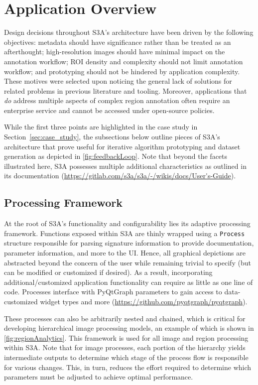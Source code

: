 \section{Application Overview}\label{sec:appFeatures}
Design decisions throughout S3A's architecture have been driven by the following objectives: metadata should have significance rather than be treated as an afterthought; high-resolution images should have minimal impact on the annotation workflow; ROI density and complexity should not limit annotation workflow; and prototyping should not be hindered by application complexity.
These motives were selected upon noticing the general lack of solutions for related problems in previous literature and tooling. Moreover, applications that \emph{do} address multiple aspects of complex region annotation often require an enterprise service and cannot be accessed under open-source policies.

While the first three points are highlighted in the case study in Section~\ref{sec:case_study}, the subsections below outline pieces of S3A's architecture that prove useful for iterative algorithm prototyping and dataset generation as depicted in \autoref{fig:feedbackLoop}. Note that beyond the facets illustrated here, S3A possesses multiple additional characteristics as outlined in its documentation (\url{https://gitlab.com/s3a/s3a/-/wikis/docs/User's-Guide}).

\makeFeedbackLoopFig

\subsection{Processing Framework}\label{sec:procFramework}
At the root of S3A's functionality and configurability lies its adaptive processing framework. Functions exposed within S3A are thinly wrapped using a \texttt{Process} structure responsible for parsing signature information to provide documentation, parameter information, and more to the UI. Hence, all graphical depictions are abstracted beyond the concern of the user while remaining trivial to specify (but can be modified or customized if desired). As a result, incorporating additional/customized application functionality can require as little as one line of code. Processes interface with PyQtGraph parameters to gain access to data-customized widget types and more (\url{https://github.com/pyqtgraph/pyqtgraph}).


These processes can also be arbitrarily nested and chained, which is critical for developing hierarchical image processing models, an example of which is shown in \autoref{fig:regionAnalytics}. This framework is used for all image and region processing within S3A. Note that for image processes, each portion of the hierarchy yields intermediate outputs to determine which stage of the process flow is responsible for various changes. This, in turn, reduces the effort required to determine which parameters must be adjusted to achieve optimal performance. 

